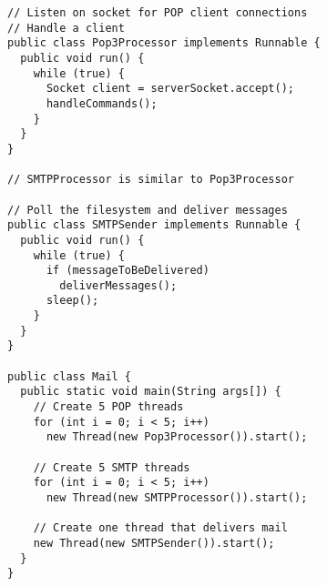 \begin{lstlisting}[frame=single]
// Listen on socket for POP client connections
// Handle a client
public class Pop3Processor implements Runnable {
  public void run() {
    while (true) {
      Socket client = serverSocket.accept();
      handleCommands();
    }
  }
}

// SMTPProcessor is similar to Pop3Processor

// Poll the filesystem and deliver messages
public class SMTPSender implements Runnable {
  public void run() {
    while (true) {
      if (messageToBeDelivered)
        deliverMessages();
      sleep();
    }
  }
}

public class Mail {
  public static void main(String args[]) {
    // Create 5 POP threads
    for (int i = 0; i < 5; i++)
      new Thread(new Pop3Processor()).start();

    // Create 5 SMTP threads
    for (int i = 0; i < 5; i++)
      new Thread(new SMTPProcessor()).start();

    // Create one thread that delivers mail
    new Thread(new SMTPSender()).start();
  }
}
\end{lstlisting}
